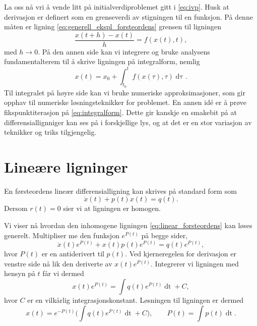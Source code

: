 \documentclass{article}
\theoremstyle{plain}
\theoremstyle{definition}
\theoremstyle{remark}
\newcommand{\diff}[1]{\mathop{d#1}}
\newcommand{\fcn}{x}
\newcommand{\expfcn}[1]{e^{#1}}
\newcommand{\biggparanth}[1]{\bigg(#1\bigg)}
\begin{document}
La oss nå vri å vende litt på initialverdiproblemet gitt i \eqref{eq:ivp}. Husk at derivasjon er definert som en grenseverdi av stigningen til en funksjon. På denne måten er ligning \eqref{eq:generell_ekspl_forsteordens} grensen til ligningen
\begin{equation*}
    \frac{\fcn(t + h) - \fcn(t)}{h} = f(\fcn(t), t),
\end{equation*}
med $h \rightarrow 0$. På den annen side kan vi integrere og bruke analysens fundamentalterem til å skrive ligningen på integralform, nemlig
\begin{equation} \label{eq:integralform}
    \fcn(t) = \fcn_0 + \int_{t_0}^{t} f(\fcn(\tau), \tau) \diff{\tau}.
\end{equation}
Til integralet på høyre side kan vi bruke numeriske approksimasjoner, som gir opphav til numeriske løsningsteknikker for problemet. En annen idé er å prøve fikspunktiterasjon på \eqref{eq:integralform}. Dette gir kanskje en smakebit på at differensiallignniger kan ses på i forskjellige lys, og at det er en stor variasjon av teknikker og triks tilgjengelig.


\section*{Lineære ligninger}

En førsteordens lineær differensialligning kan skrives på standard form som
\begin{equation} \label{eq:linear_forsteordens}
    \dot{\fcn}(t) + p(t) \fcn(t) = q(t).
\end{equation}
Dersom $r(t) = 0$ sier vi at ligningen er homogen.

Vi viser nå hvordan den inhomogene ligningen \eqref{eq:linear_forsteordens} kan løses generelt. Multipliser me den funksjon $\expfcn{P(t)}$ på begge sider,
\begin{equation*}
    \dot{\fcn}(t) \expfcn{P(t)} + \fcn(t) p(t) \expfcn{P(t)} = q(t) \expfcn{P(t)},
\end{equation*}
hvor $P(t)$ er en antiderivert til $p(t)$. Ved kjerneregelen for derivasjon er venstre side nå lik den deriverte av $\fcn(t) \expfcn{P(t)}$. Integrerer vi ligningen med hensyn på $t$ får vi dermed
\begin{equation*}
    \fcn(t) \expfcn{P(t)} = \int q(t) \expfcn{P(t)} \diff{t} + C, 
\end{equation*}
hvor $C$ er en vilkårlig integrasjonskonstant. Løsningen til ligningen er dermed
\begin{equation} \label{eq:generell_losn_linear}
    \fcn(t) = \expfcn{-P(t)} \biggparanth{\int q(t) \expfcn{P(t)} \diff{t} + C}, \qquad P(t) = \int p(t) \diff{t}.
\end{equation}
\end{document}
